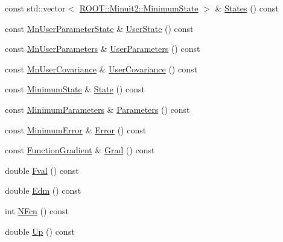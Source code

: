 \begin{DoxyCompactItemize}
const std\+::vector$<$ \mbox{\hyperlink{classROOT_1_1Minuit2_1_1MinimumState}{R\+O\+O\+T\+::\+Minuit2\+::\+Minimum\+State}} $>$ \& \mbox{\hyperlink{classROOT_1_1Minuit2_1_1FunctionMinimum_a5f08def4f7ca92700393d42ded6eb237}{States}} () const
\item 
const \mbox{\hyperlink{classROOT_1_1Minuit2_1_1MnUserParameterState}{Mn\+User\+Parameter\+State}} \& \mbox{\hyperlink{classROOT_1_1Minuit2_1_1FunctionMinimum_a698dc320ec24e2288f391f160ef8213e}{User\+State}} () const
\item 
const \mbox{\hyperlink{classROOT_1_1Minuit2_1_1MnUserParameters}{Mn\+User\+Parameters}} \& \mbox{\hyperlink{classROOT_1_1Minuit2_1_1FunctionMinimum_ac916253d7e29de7da4da5bf4b84a2ad5}{User\+Parameters}} () const
\item 
const \mbox{\hyperlink{classROOT_1_1Minuit2_1_1MnUserCovariance}{Mn\+User\+Covariance}} \& \mbox{\hyperlink{classROOT_1_1Minuit2_1_1FunctionMinimum_aeb3d5cb9f9c49838fa4b08668c8556db}{User\+Covariance}} () const
\item 
const \mbox{\hyperlink{classROOT_1_1Minuit2_1_1MinimumState}{Minimum\+State}} \& \mbox{\hyperlink{classROOT_1_1Minuit2_1_1FunctionMinimum_aa57279a22070860400c8854289c84314}{State}} () const
\item 
const \mbox{\hyperlink{classROOT_1_1Minuit2_1_1MinimumParameters}{Minimum\+Parameters}} \& \mbox{\hyperlink{classROOT_1_1Minuit2_1_1FunctionMinimum_a069ba097db08f87582b309330ef8aa6e}{Parameters}} () const
\item 
const \mbox{\hyperlink{classROOT_1_1Minuit2_1_1MinimumError}{Minimum\+Error}} \& \mbox{\hyperlink{classROOT_1_1Minuit2_1_1FunctionMinimum_a24f73efe7b4ed139bcf28e62ab01b347}{Error}} () const
\item 
const \mbox{\hyperlink{classROOT_1_1Minuit2_1_1FunctionGradient}{Function\+Gradient}} \& \mbox{\hyperlink{classROOT_1_1Minuit2_1_1FunctionMinimum_ac97896abe1c4625c519c2b07e4e9b670}{Grad}} () const
\item 
double \mbox{\hyperlink{classROOT_1_1Minuit2_1_1FunctionMinimum_a72aa9fd2b33f1bb56c5b053d536cc32c}{Fval}} () const
\item 
double \mbox{\hyperlink{classROOT_1_1Minuit2_1_1FunctionMinimum_aef90d7ca242a7ea211d56b188679f4b9}{Edm}} () const
\item 
int \mbox{\hyperlink{classROOT_1_1Minuit2_1_1FunctionMinimum_a8af0f1813c9ae51d7a57a1de0cbae42f}{N\+Fcn}} () const
\item 
double \mbox{\hyperlink{classROOT_1_1Minuit2_1_1FunctionMinimum_a53be50e5f3a36b22144bb98fc55c9340}{Up}} () const

\end{DoxyCompactItemize}
